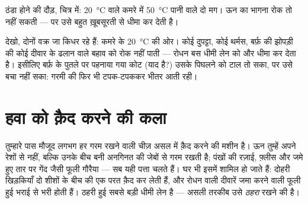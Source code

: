 \begin{omfigure}

{\small ठंडा होने की दौड़, चित्र में: \qty{20}{\celsius} वाले कमरे
में \qty{50}{\celsius} पानी वाले दो मग। ऊन  का भागना रोक तो नहीं
सकती --- पर उसे बहुत ख़ूबसूरती से धीमा कर देती है।}
\end{omfigure}

\begin{remark}[रोधन सिर्फ़ धीमा करता है]\label{rem:g5:heat-and-insulation:onlyslows}
देखो, दोनों वक्र जा किधर रहे हैं: कमरे के \qty{20}{\celsius} की ओर।
कोई दुपट्टा, कोई थर्मस, बर्फ़ की झोपड़ी की कोई दीवार  के ढलान
वाले बहाव को रोक नहीं पाती --- रोधन बस धीमी लेन को और धीमा कर देता
है। इसीलिए बर्फ़ के पुतले पर पहनाया गया कोट (याद है?) उसके पिघलने को
टाल तो सका, पर उसे बचा नहीं सका: गरमी की  फिर भी टपक-टपककर भीतर
आती रही।
\end{remark}

\section{हवा को क़ैद करने की कला}

\begin{example}[जाड़े की इंजीनियरी]\label{ex:g5:heat-and-insulation:air}
तुम्हारे पास मौजूद लगभग हर गरम रखने वाली चीज़ असल में  क़ैद करने
की मशीन है। ऊन तुम्हें अपने रेशों से नहीं, बल्कि उनके बीच बनी अनगिनत
 की जेबों से गरम रखती है; पंखों की रज़ाई, फ़्लीस और जमे हुए तार पर
गेंद जैसी फूली गौरैया --- सब यही पत्ता चलते हैं। घर भी इसमें शामिल हो
जाते हैं: दोहरी खिड़कियाँ दो शीशों के बीच  की एक परत क़ैद कर लेती
हैं, और रोधन वाली दीवारें  जमा करने वाली फूली हुई भराई से भरी होती
हैं। ठहरी हुई  सबसे बड़ी धीमी लेन है --- असली तरकीब उसे
\emph{ठहरा} रखने की है।
\end{example}

